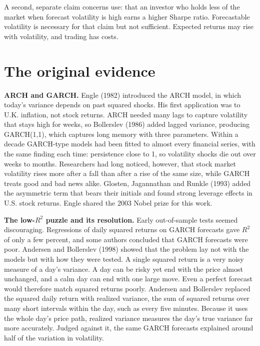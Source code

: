 A second, separate claim concerns use: that an investor who holds less of the market when forecast volatility is high earns a higher Sharpe ratio. Forecastable volatility is necessary for that claim but not sufficient. Expected returns may rise with volatility, and trading has costs.


\section{The original evidence}
\label{sec:10-evidence}

\textbf{ARCH and GARCH.} Engle (1982) introduced the ARCH model, in which today's variance depends on past squared shocks. His first application was to U.K. inflation, not stock returns. ARCH needed many lags to capture volatility that stays high for weeks, so Bollerslev (1986) added lagged variance, producing GARCH(1,1), which captures long memory with three parameters. Within a decade GARCH-type models had been fitted to almost every financial series, with the same finding each time: persistence close to 1, so volatility shocks die out over weeks to months. Researchers had long noticed, however, that stock market volatility rises more after a fall than after a rise of the same size, while GARCH treats good and bad news alike. Glosten, Jagannathan and Runkle (1993) added the asymmetric term that bears their initials and found strong leverage effects in U.S. stock returns. Engle shared the 2003 Nobel prize for this work.

\textbf{The low-$R^2$ puzzle and its resolution.} Early out-of-sample tests seemed discouraging. Regressions of daily squared returns on GARCH forecasts gave $R^2$ of only a few percent, and some authors concluded that GARCH forecasts were poor. Andersen and Bollerslev (1998) showed that the problem lay not with the models but with how they were tested. A single squared return is a very noisy measure of a day's variance. A day can be risky yet end with the price almost unchanged, and a calm day can end with one large move. Even a perfect forecast would therefore match squared returns poorly. Andersen and Bollerslev replaced the squared daily return with realized variance, the sum of squared returns over many short intervals within the day, such as every five minutes. Because it uses the whole day's price path, realized variance measures the day's true variance far more accurately. Judged against it, the same GARCH forecasts explained around half of the variation in volatility.

